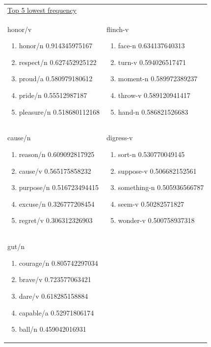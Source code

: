 \documentclass[12pt]{article}
\begin{document}
\begin{longtable}{ p{7cm} | p{7cm} }
		\underline{Top 5 lowest frequency} &  \\
		honor/v
		\begin{enumerate}
			\item honor/n 0.914345975167
			\item respect/n 0.627452925122
			\item proud/a 0.580979180612
			\item pride/n 0.55512987187
			\item pleasure/n 0.518680112168
		\end{enumerate} &
		flinch-v
		\begin{enumerate}
			\item face-n 0.634137640313
			\item turn-v 0.594026517471
			\item moment-n 0.589972389237
			\item throw-v 0.589120941417
			\item hand-n 0.586821526683
		\end{enumerate}
		\\
		cause/n
		\begin{enumerate}
			\item reason/n 0.609092817925
			\item cause/v 0.565175858232
			\item purpose/n 0.516723494415
			\item excuse/n 0.326777208454
			\item regret/v 0.306312326903
		\end{enumerate} &
		digress-v
		\begin{enumerate}
			\item sort-n 0.530770049145
			\item suppose-v 0.506682152561
			\item something-n 0.505936566787
			\item seem-v 0.50282571827
			\item wonder-v 0.500758937318
		\end{enumerate}
		\\
		gut/n
		\begin{enumerate}
			\item courage/n 0.805742297034
			\item brave/v 0.723577063421
			\item dare/v 0.618285158884
			\item capable/a 0.52971806174
			\item ball/n 0.459042016931
		\end{enumerate} &

\end{longtable}
\end{document}

